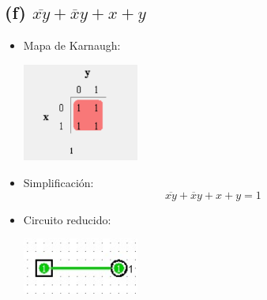 \subsection*{(f) $\overline{xy} + \overline{x}y + x + y$}

\begin{itemize}
    \item Mapa de Karnaugh:
\begin{center}
    \includegraphics[width=0.3\textwidth]{recursos/Ejercicio3/mapas/mapa_f).png}
\end{center}

    \item Simplificación: \[ \overline{xy} + \overline{x}y + x + y = 1 \]

    \item Circuito reducido:
\begin{center}
    \includegraphics[width=0.3\textwidth]{recursos/Ejercicio3/circuito/circuito_f).png}

\end{center}
\end{itemize}



